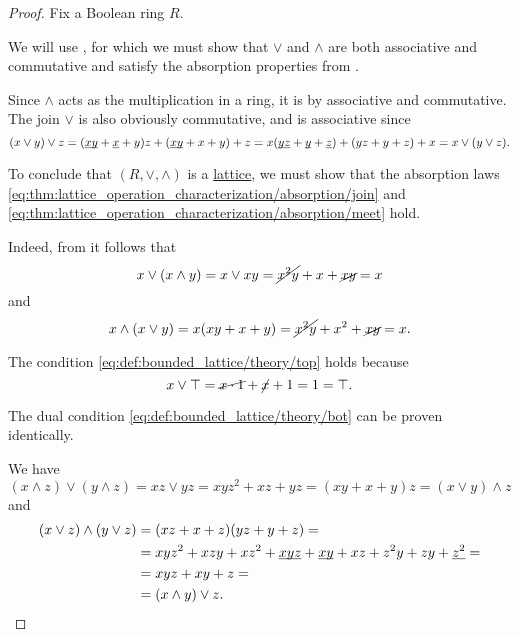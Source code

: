 \begin{proof}
  Fix a Boolean ring \( R \).

   We will use , for which we must show that \( {\vee} \) and \( {\wedge} \) are both associative and commutative and satisfy the absorption properties from .

  Since \( {\wedge} \) acts as the multiplication in a ring, it is by associative and commutative. The join \( {\vee} \) is also obviously commutative, and is associative since
  \begin{equation*}
    (x \vee y) \vee z
    =
    (\underline{\smash{xy}} + \underline{\smash{x}} + y)z + (\underline{\smash{xy}} + x + y) + z
    =
    x(\underline{\smash{yz}} + \underline{\smash{y}} + \underline{\smash{z}}) + (yz + y + z) + x
    =
    x \vee (y \vee z).
  \end{equation*}

  To conclude that \( (R, \vee, \wedge) \) is a \hyperref[def:lattice]{lattice}, we must show that the absorption laws \eqref{eq:thm:lattice_operation_characterization/absorption/join} and \eqref{eq:thm:lattice_operation_characterization/absorption/meet} hold.

  Indeed, from  it follows that
  \begin{equation*}
    x \vee (x \wedge y)
    =
    x \vee xy
    =
    \cancel{x^2 y} + x + \cancel{xy}
    =
    x
  \end{equation*}
  and
  \begin{equation*}
    x \wedge (x \vee y)
    =
    x(xy + x + y)
    =
    \cancel{x^2 y} + x^2 + \cancel{xy}
    =
    x.
  \end{equation*}

   The condition \eqref{eq:def:bounded_lattice/theory/top} holds because
  \begin{equation*}
    x \vee \top
    =
    \cancel{x \cdot 1} + \cancel{x} + 1
    =
    1
    =
    \top.
  \end{equation*}

  The dual condition \eqref{eq:def:bounded_lattice/theory/bot} can be proven identically.

   We have
  \begin{equation*}
    (x \wedge z) \vee (y \wedge z)
    =
    xz \vee yz
    =
    xyz^2 + xz + yz
    =
    (xy + x + y)z
    =
    (x \vee y) \wedge z
  \end{equation*}
  and
  \begin{align*}
    (x \vee z) \wedge (y \vee z)
    &=
    (xz + x + z)(yz + y + z)
    = \\ &=
    xyz^2 + xzy + xz^2 + \underline{\smash{xyz}} + \underline{\smash{xy}} + xz + z^2y + zy + \underline{\smash{z^2}}
    = \\ &=
    xyz + xy + z
    = \\ &=
    (x \wedge y) \vee z.
  \end{align*}


\end{proof}
